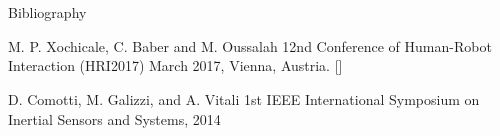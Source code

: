 \documentclass[compress]{beamer}
\begin{document}
\section{}



%
%
%
%



\closingtitle


\begin{frame}{Bibliography}
    \begin{thebibliography}{10}

\beamertemplatearticlebibitems
      M. P. Xochicale, C. Baber and M. Oussalah
      \newblock {}
      \newblock 12nd Conference of Human-Robot Interaction (HRI2017) March 2017, Vienna, Austria. [\href{https:// github.com/mxochicale/publications/tree/master/2017/HRI}{\faGithub}]

\beamertemplatearticlebibitems
      D. Comotti, M. Galizzi, and A. Vitali
      \newblock {}
      \newblock 1st IEEE International Symposium on Inertial Sensors and Systems, 2014


    \end{thebibliography}
\end{frame}



\end{document}
